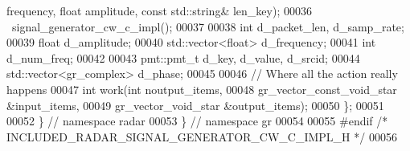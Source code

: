 \begin{DoxyCode}
      frequency, \textcolor{keywordtype}{float} amplitude, \textcolor{keyword}{const} std::string& len\_key);
00036       ~signal_generator_cw_c_impl();
00037       
00038       \textcolor{keywordtype}{int} d_packet_len, d_samp_rate;
00039       \textcolor{keywordtype}{float} d_amplitude;
00040       std::vector<float> d_frequency;
00041       \textcolor{keywordtype}{int} d_num_freq;
00042       
00043       pmt::pmt\_t d_key, d_value, d_srcid;
00044       std::vector<gr\_complex> d_phase;
00045 
00046       \textcolor{comment}{// Where all the action really happens}
00047       \textcolor{keywordtype}{int} work(\textcolor{keywordtype}{int} noutput\_items,
00048            gr\_vector\_const\_void\_star &input\_items,
00049            gr\_vector\_void\_star &output\_items);
00050     \};
00051 
00052   \} \textcolor{comment}{// namespace radar}
00053 \} \textcolor{comment}{// namespace gr}
00054 
00055 \textcolor{preprocessor}{#endif }\textcolor{comment}{/* INCLUDED\_RADAR\_SIGNAL\_GENERATOR\_CW\_C\_IMPL\_H */}\textcolor{preprocessor}{}
00056 
\end{DoxyCode}
